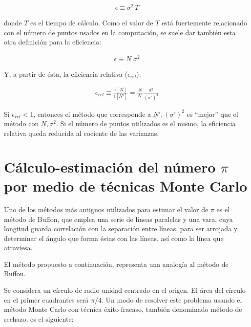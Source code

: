 \begin{eqnarray}
 	\epsilon \equiv \sigma ^{2} \, T
 \label{EqZZZ9}
\end{eqnarray}


donde $T$ es el tiempo de c\'alculo.
%
Como el valor de $T$ est\'a fuertemente relacionado con el n\'umero de puntos usados en la computaci\'on, se suele dar tambi\'en esta otra
definici\'on para la eficiencia:

\begin{eqnarray}
 	\epsilon \equiv N \; \sigma ^{2}
 \label{EqZZZ10}
\end{eqnarray}

Y, a partir de \'esta, la eficiencia relativa ($\epsilon_{rel}$):


\begin{eqnarray}
 	\epsilon_{rel} \equiv \frac{\epsilon [N]}{\epsilon [N']} = \frac{N}{N'} \frac{\sigma ^{2}}{(\sigma') ^{2}}
 \label{EqZZZ11}
\end{eqnarray}


Si $\epsilon_{rel} < 1$, entonces el m\'etodo que corresponde a $N', (\sigma') ^{2}$ es
``mejor'' que el m\'etodo con $N, \sigma ^{2}$.
%
Si el n\'umero de puntos utilizados es el mismo, la eficiencia relativa queda reducida al cociente de las varianzas.



\section{C\'alculo-estimaci\'on del n\'umero $\pi$ por medio de t\'ecnicas Monte Carlo}
\label{CapVII_3}

Uno de los m\'etodos m\'as antiguos utilizados para estimar el valor de $\pi$ es el m\'etodo de Buffon, que emplea una serie de l\'ineas
paralelas y una vara, cuya longitud guarda correlaci\'on con la separaci\'on entre l\'ineas, para ser arrojada y determinar el \'angulo
que forma \'estas con las l\'ineas, as\'i como la l\'inea que atraviesa.
%

El m\'etodo propuesto a continuaci\'on, representa una analog\'ia al m\'etodo de Buffon.
%

Se considera un c\'irculo de radio unidad centrado en el origen. El \'area del c\'irculo en el primer cuadrantes ser\'a $\pi/4$.
%
Un modo de resolver este problema usando el m\'etodo Monte Carlo con t\'ecnica \'exito-fracaso, tambi\'en denominado m\'etodo de rechazo,
es el siguiente:

